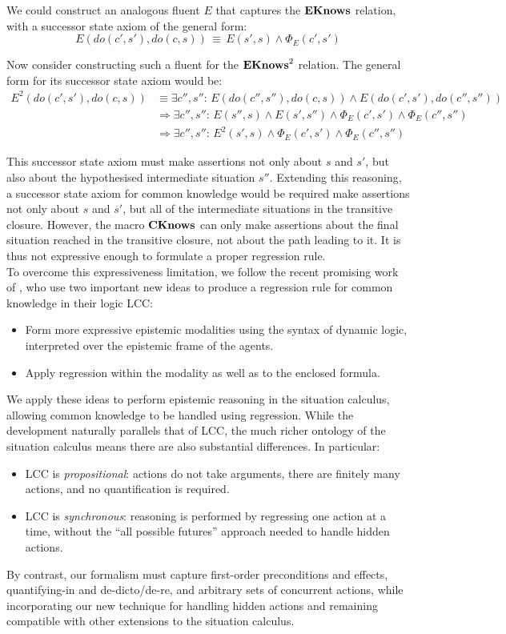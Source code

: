 We could construct an analogous fluent $E$ that captures the $\mathbf{EKnows}$
relation, with a successor state axiom of the general form:\[
E(do(c',s'),do(c,s))\,\equiv\, E(s',s)\wedge\Phi_{E}(c',s')\]


Now consider constructing such a fluent for the $\mathbf{EKnows}^{2}$ relation.
The general form for its successor state axiom would be:\begin{align*}
E^{2}(do(c',s'),do(c,s)) & \equiv\exists c'',s'':\, E(do(c'',s''),do(c,s))\wedge E(do(c',s'),do(c'',s''))\\
 & \Rightarrow\exists c'',s'':\, E(s'',s)\wedge E(s',s'')\wedge\Phi_{E}(c',s')\wedge\Phi_{E}(c'',s'')\\
 & \Rightarrow\exists c'',s'':\, E^{2}(s',s)\wedge\Phi_{E}(c',s')\wedge\Phi_{E}(c'',s'')\end{align*}


This successor state axiom must make assertions not only about $s$
and $s'$, but also about the hypothesised intermediate situation
$s''$. Extending this reasoning, a successor state axiom for common
knowledge would be required make assertions not only about $s$ and
$s'$, but all of the intermediate situations in the transitive closure.
However, the macro $\mathbf{CKnows}$ can only make assertions about the final
situation reached in the transitive closure, not about the path leading
to it. It is thus not expressive enough to formulate a proper regression
rule.\\


To overcome this expressiveness limitation, we follow the recent promising
work of \citep{vanBenthem06lcc}, who use two important new ideas
to produce a regression rule for common knowledge in their logic LCC:

\begin{itemize}
\item Form more expressive epistemic modalities using the syntax of dynamic
logic, interpreted over the epistemic frame of the agents. 
\item Apply regression within the modality as well as to the enclosed formula. 
\end{itemize}
We apply these ideas to perform epistemic reasoning in the situation
calculus, allowing common knowledge to be handled using regression.
While the development naturally parallels that of LCC, the much richer
ontology of the situation calculus means there are also substantial
differences. In particular:

\begin{itemize}
\item LCC is \emph{propositional}: actions do not take arguments, there
are finitely many actions, and no quantification is required. 
\item LCC is \emph{synchronous}: reasoning is performed by regressing one
action at a time, without the {}``all possible futures'' approach
needed to handle hidden actions. 
\end{itemize}
By contrast, our formalism must capture first-order preconditions
and effects, quantifying-in and de-dicto/de-re, and arbitrary sets
of concurrent actions, while incorporating our new technique for handling
hidden actions and remaining compatible with other extensions to the
situation calculus.

